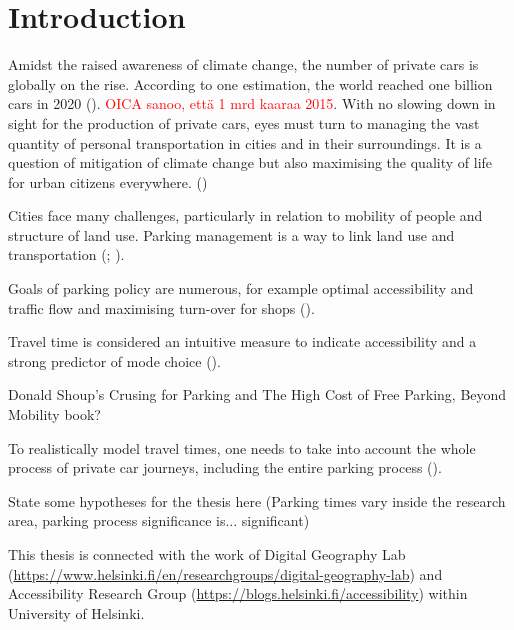 \section{Introduction}
\justify


Amidst the raised awareness of climate change, the number of private cars is globally on the rise. According to one estimation, the world reached one billion cars in 2020 (\cite{Sperling2009}). \textcolor{red}{OICA sanoo, että 1 mrd kaaraa 2015}. With no slowing down in sight for the production of private cars, eyes must turn to managing the vast quantity of personal transportation in cities and in their surroundings. It is a question of mitigation of climate change but also maximising the quality of life for urban citizens everywhere. (\cite{StatisticsFinland2019})

Cities face many challenges, particularly in relation to mobility of people and structure of land use. Parking management is a way to link land use and transportation (\cite{Marsden2006}; \cite{Diallo2015}).

Goals of parking policy are numerous, for example optimal accessibility and traffic flow and maximising turn-over for shops (\cite{Marsden2006}).

Travel time is considered an intuitive measure to indicate accessibility and a strong predictor of mode choice (\cite{Frank2008}).

Donald Shoup's Crusing for Parking and The High Cost of Free Parking, Beyond Mobility book?

To realistically model travel times, one needs to take into account the whole process of private car journeys, including the entire parking process (\cite{Salonen2013}).

State some hypotheses for the thesis here (Parking times vary inside the research area, parking process significance is... significant)

This thesis is connected with the work of Digital Geography Lab (\textcolor{blue}{\url{https://www.helsinki.fi/en/researchgroups/digital-geography-lab}}) and Accessibility Research Group (\textcolor{blue}{\url{https://blogs.helsinki.fi/accessibility}}) within University of Helsinki.

